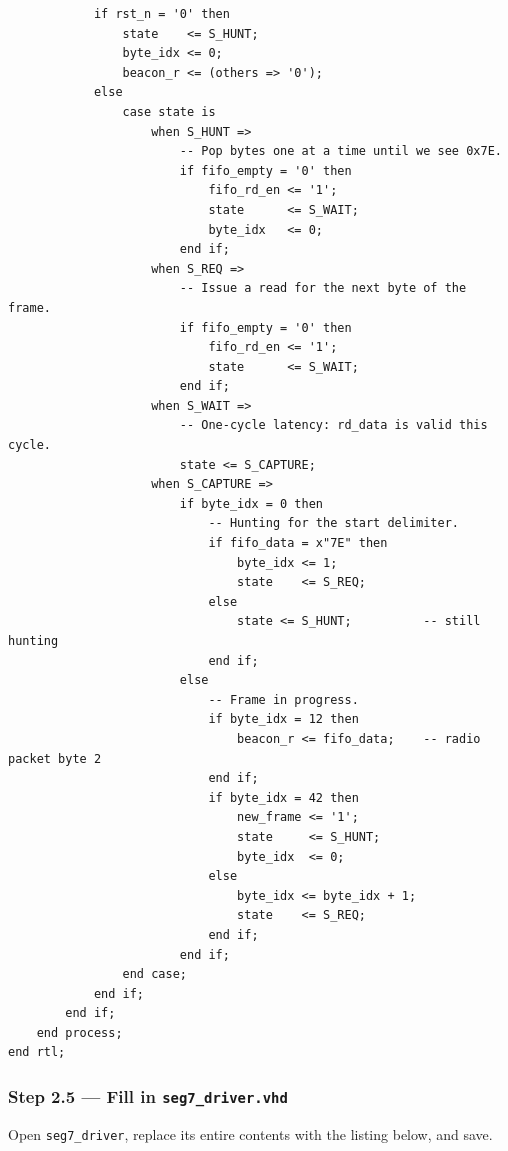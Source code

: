 \documentclass[11pt,letterpaper]{article}
\begin{document}
\begin{lstlisting}
            if rst_n = '0' then
                state    <= S_HUNT;
                byte_idx <= 0;
                beacon_r <= (others => '0');
            else
                case state is
                    when S_HUNT =>
                        -- Pop bytes one at a time until we see 0x7E.
                        if fifo_empty = '0' then
                            fifo_rd_en <= '1';
                            state      <= S_WAIT;
                            byte_idx   <= 0;
                        end if;
                    when S_REQ =>
                        -- Issue a read for the next byte of the frame.
                        if fifo_empty = '0' then
                            fifo_rd_en <= '1';
                            state      <= S_WAIT;
                        end if;
                    when S_WAIT =>
                        -- One-cycle latency: rd_data is valid this cycle.
                        state <= S_CAPTURE;
                    when S_CAPTURE =>
                        if byte_idx = 0 then
                            -- Hunting for the start delimiter.
                            if fifo_data = x"7E" then
                                byte_idx <= 1;
                                state    <= S_REQ;
                            else
                                state <= S_HUNT;          -- still hunting
                            end if;
                        else
                            -- Frame in progress.
                            if byte_idx = 12 then
                                beacon_r <= fifo_data;    -- radio packet byte 2
                            end if;
                            if byte_idx = 42 then
                                new_frame <= '1';
                                state     <= S_HUNT;
                                byte_idx  <= 0;
                            else
                                byte_idx <= byte_idx + 1;
                                state    <= S_REQ;
                            end if;
                        end if;
                end case;
            end if;
        end if;
    end process;
end rtl;
\end{lstlisting}

\subsubsection*{Step 2.5 --- Fill in \texttt{seg7\_driver.vhd}}

Open \texttt{seg7\_driver}, replace its entire contents with the listing below, and save.
\end{document}
